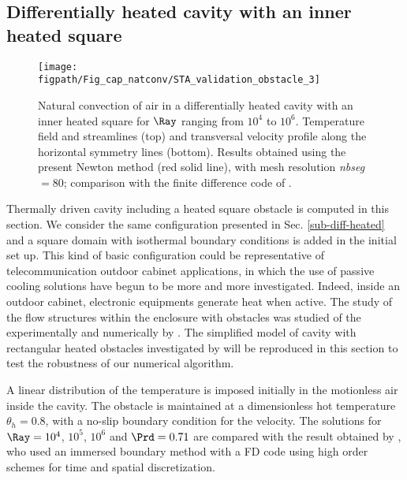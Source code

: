 \subsection{Differentially heated cavity with an inner heated square} \label{sub-2D-OBSTACLE}

\begin{figure}
	\begin{center}
		\texttt{[image: \\figpath/Fig\_cap\_natconv/STA\_validation\_obstacle\_3]} 
	\end{center}
	\caption{Natural convection of air in a differentially heated cavity with an inner heated square for $\Ray$ ranging from $10^4$ to $10^6$. Temperature field and streamlines (top) and transversal velocity profile along the  horizontal symmetry lines (bottom). Results obtained using the present Newton method (red solid line), with mesh resolution {\em nbseg} $=80$; comparison with the finite difference code of \cite{Raluca2013}.}
	\label{fig-obst-2D}
\end{figure}

Thermally driven cavity including a heated square obstacle is computed in this section.
We consider the same configuration presented in Sec. \ref{sub-diff-heated} and a square domain with isothermal boundary conditions is added in the initial set up.
This kind of basic configuration could be representative of telecommunication outdoor cabinet applications, in which the use of passive cooling solutions have begun to be more and more investigated.
Indeed, inside an outdoor cabinet, electronic equipments generate heat when active. 
The study of the flow structures within the enclosure with obstacles was studied of the experimentally and numerically by \cite{Raluca2013}.
The simplified model of cavity with rectangular heated obstacles investigated by \cite{Raluca2013} will be reproduced in this section to test the robustness of our numerical algorithm.

A linear distribution of the temperature is imposed initially in the motionless air inside the cavity.
The obstacle is maintained at a dimensionless hot temperature $\theta_h = 0.8$, with a no-slip boundary condition for the velocity.
The solutions for $\Ray= 10^4$, $10^5$, $10^6$ and $\Prd = 0.71$ are compared with the result obtained by \cite{Raluca2013}, who used an immersed boundary method with a FD code using high order schemes for time and spatial discretization.

